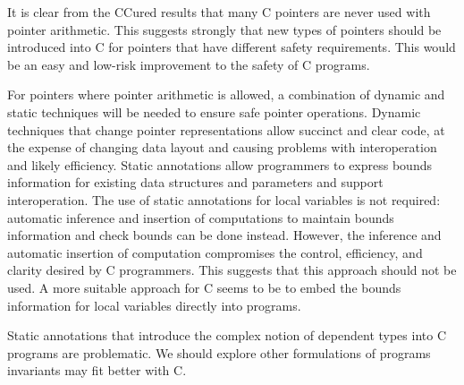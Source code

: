 It is clear from the CCured results that many C pointers are never used
with pointer arithmetic. This suggests strongly that new types of
pointers should be introduced into C for pointers that have different
safety requirements. This would be an easy and low-risk improvement to
the safety of C programs.

For pointers where pointer arithmetic is allowed, a combination of
dynamic and static techniques will be needed to ensure safe pointer
operations. Dynamic techniques that change pointer representations allow
succinct and clear code, at the expense of changing data layout and
causing problems with interoperation and likely efficiency. Static
annotations allow programmers to express bounds information for existing
data structures and parameters and support interoperation. The use of
static annotations for local variables is not required: automatic
inference and insertion of computations to maintain bounds information
and check bounds can be done instead. However, the inference and
automatic insertion of computation compromises the control, efficiency,
and clarity desired by C programmers. This suggests that this approach
should not be used. A more suitable approach for C seems to be to embed
the bounds information for local variables directly into programs.

Static annotations that introduce the complex notion of dependent types
into C programs are problematic. We should explore other formulations of
programs invariants may fit better with C.